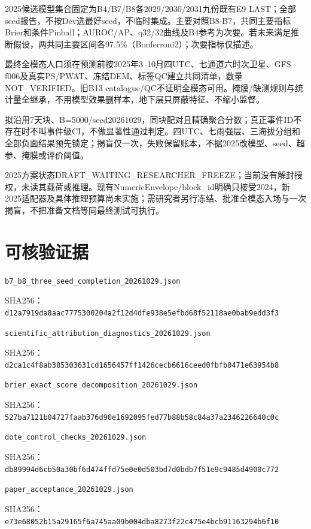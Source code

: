 \documentclass[UTF8,a4paper,10pt,fontset=none]{ctexart}
\begin{document}
2025候选模型集合固定为B4/B7/B8各2029/2030/2031九份既有E9 LAST；全部seed报告，不按Dev选最好seed，不临时集成。主要对照B8-B7，共同主要指标Brier和条件Pinball；AUROC/AP、q32/32曲线及B4参考为次要。若未来满足推断假设，两共同主要区间各97.5\%（Bonferroni2）；次要指标仅描述。

最终全模态人口须在预测前按2025年3–10月四UTC、七通道六时次卫星、GFS f006及真实PS/PWAT、冻结DEM、标签QC建立共同清单，数量NOT\_VERIFIED。旧B13 catalogue/QC不证明全模态可用。掩膜/缺测规则与统计量全继承，不用模型效果删样本，地下层只屏蔽特征、不缩小监督。

拟沿用7天块、B=5000/seed20261029，同块配对且精确聚合分数；真正事件ID不存在时不叫事件级CI，不做显著性通过判定。四UTC、七雨强层、三海拔分组和全部负面结果预先锁定；揭盲仅一次，失败保留账本，不据2025改模型、seed、超参、掩膜或评价阈值。

2025方案状态DRAFT\_WAITING\_RESEARCHER\_FREEZE；当前没有解封授权，未读其载荷或推理。现有NumericEnvelope/block\_id明确只接受2024，新2025适配器及具体推理预算尚未实施；需研究者另行冻结、批准全模态入场与一次揭盲，不把准备文档等同最终测试可执行。
\section{可核验证据}
\texttt{b7\_b8\_three\_seed\_completion\_20261029.json}\par
 SHA256：\texttt{\small d12a7919da8aac7775300204a2f12d4dfe938e5efbd68f52118ae0bab9edd3f3}\par
\texttt{scientific\_attribution\_diagnostics\_20261029.json}\par
 SHA256：\texttt{\small d2ca1c4f8ab385303631cd1656457ff1426cecb6616ceed0fbfb0471e63954b8}\par
\texttt{brier\_exact\_score\_decomposition\_20261029.json}\par
 SHA256：\texttt{\small 527ba7121b04727faab376d90e1692095fed77b88b58c84a37a2346226640c0c}\par
\texttt{dote\_control\_checks\_20261029.json}\par
 SHA256：\texttt{\small db89994d6cb50a30bf6d474ffd75e0e0d503bd7d0bdb7f51e9c9485d4900c772}\par
\texttt{paper\_acceptance\_20261029.json}\par
 SHA256：\texttt{\small e73e68052b15a29165f6a745aa09b004dba8273f22c475e4bcb91163294b6f10}\par
\end{document}
